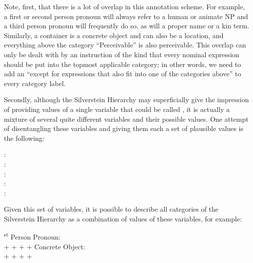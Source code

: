 Note, first, that there is a lot of overlap in this annotation  scheme. For example, a first or second person pronoun  will always refer to a human  or animate NP and a third person pronoun  will frequently do so, as will a proper name or a kin term. Similarly, a container is a concrete  object and can also be a location, and everything above the category ``Perceivable'' is also perceivable. This overlap can only be dealt with by an instruction of the kind that every nominal  expression should be put into the topmost applicable category; in other words, we need to add an ``except for expressions that also fit into one of the categories  above'' to every category label.

Secondly, although the Silverstein  Hierarchy may superficially give the impression of providing values of a single variable that could be called ,  it is actually a mixture of several quite different variables and their possible values. One attempt of disentangling these variables and giving them each a set of plausible values is the following:

\begin{exe}
\ex
\begin{xlist}
\label{ex:silversteinuntangled}
\ex {}:\\
\ex {}:\\
\ex {}:\\
\ex {}:\\
\ex {}:\\
\end{xlist}
\end{exe}

Given this set of variables, it is possible to describe all categories of the Silverstein  Hierarchy as a combination of values of these variables, for example:

\begin{exe}
\ex
\begin{xlist}
\label{ex:silversteincomb}
\textsuperscript{st} Person Pronoun:\\
 +  +  +  + 
\ex Concrete Object:\\
 +  +  +  + 
\end{xlist}
\end{exe}


